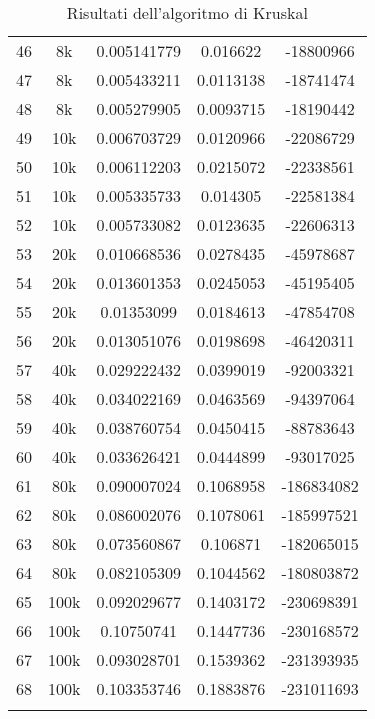 \begin{center}
\begin{longtable}{|c|c|c|c|c|}
46 & 8k & 0.005141779 & 0.016622 & -18800966\\
47 & 8k & 0.005433211 & 0.0113138 & -18741474\\
48 & 8k & 0.005279905 & 0.0093715 & -18190442\\
\hline
49 & 10k & 0.006703729 & 0.0120966 & -22086729\\
50 & 10k & 0.006112203 & 0.0215072 & -22338561\\
51 & 10k & 0.005335733 & 0.014305 & -22581384\\
52 & 10k & 0.005733082 & 0.0123635 & -22606313\\
\hline
53 & 20k & 0.010668536 & 0.0278435 & -45978687\\
54 & 20k & 0.013601353 & 0.0245053 & -45195405\\
55 & 20k & 0.01353099 & 0.0184613 & -47854708\\
56 & 20k & 0.013051076 & 0.0198698 & -46420311\\
\hline
57 & 40k & 0.029222432 & 0.0399019 & -92003321\\
58 & 40k & 0.034022169 & 0.0463569 & -94397064\\
59 & 40k & 0.038760754 & 0.0450415 & -88783643\\
60 & 40k & 0.033626421 & 0.0444899 & -93017025\\
\hline
61 & 80k & 0.090007024 & 0.1068958 & -186834082\\
62 & 80k & 0.086002076 & 0.1078061 & -185997521\\
63 & 80k & 0.073560867 & 0.106871 & -182065015\\
64 & 80k & 0.082105309 & 0.1044562 & -180803872\\
\hline
65 & 100k & 0.092029677 & 0.1403172 & -230698391\\
66 & 100k & 0.10750741 & 0.1447736 & -230168572\\
67 & 100k & 0.093028701 & 0.1539362 & -231393935\\
68 & 100k & 0.103353746 & 0.1883876 & -231011693\\ \hline
		\caption{Risultati dell'algoritmo di Kruskal} 
	\end{longtable}
\end{center}
